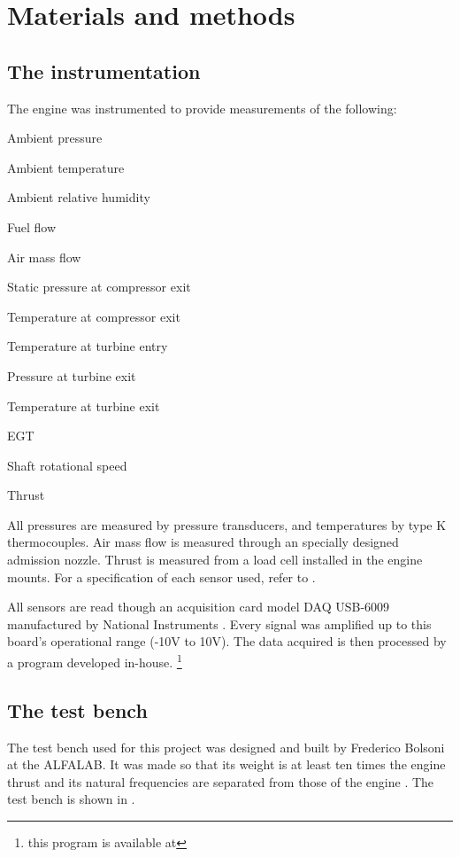\chapter{Materials and methods}
\label{ch:methods}

\section{The instrumentation}
The engine was instrumented to provide measurements of the following:
\begin{compactitem}
    \item Ambient pressure
    \item Ambient temperature
    \item Ambient relative humidity
    \item Fuel flow
    \item Air mass flow
    \item Static pressure at compressor exit
    \item Temperature at compressor exit
    \item Temperature at turbine entry
    \item Pressure at turbine exit
    \item Temperature at turbine exit
    \item \gls{EGT}
    \item Shaft rotational speed
    \item Thrust
\end{compactitem}

All pressures are measured by pressure transducers, and temperatures by type K thermocouples. 
Air mass flow is measured through an specially designed admission nozzle. 
Thrust is measured from a load cell installed in the engine mounts.
For a specification of each sensor used, refer to .

All sensors are read though an acquisition card 
model DAQ USB-6009 manufactured by National Instruments .
Every signal was amplified up to this board's operational range (-10V to 10V). 
The data acquired is then processed by a program developed in-house.%
\footnote{this program is available at }

\section{The test bench}

The test bench used for this project was designed and built by Frederico Bolsoni at the \gls{ALFALAB}.
It was made so that its weight is at least ten times the engine thrust 
 and its natural frequencies are separated from those of the engine \cite{bolsoni}.
The test bench is shown in .

